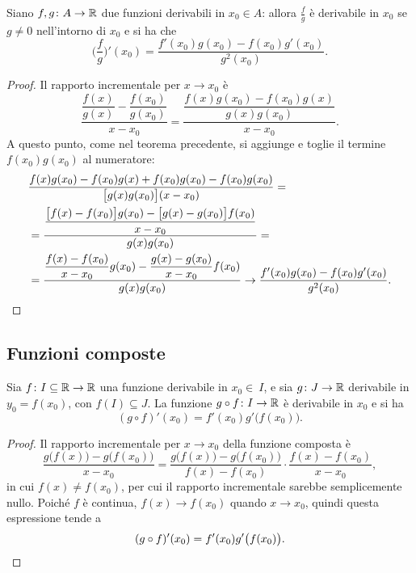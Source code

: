 \begin{proprieta}
Siano $f,g\colon A\to\mathbb{R}$ due funzioni derivabili in $x_0\in A$: allora $\frac{f}{g}$ è derivabile in $x_0$ se $g\neq 0$ nell'intorno di $x_0$ e si ha che
\begin{equation}
\bigg(\frac{f}{g}\bigg)'(x_0)=\frac{f'(x_0)g(x_0)-f(x_0)g'(x_0)}{g^2(x_0)}.
\end{equation}
\end{proprieta}
\begin{proof}
Il rapporto incrementale per $x\to x_0$ è
\[
\frac{\dfrac{f(x)}{g(x)}-\dfrac{f(x_0)}{g(x_0)}}{x-x_0}=\frac{\dfrac{f(x)g(x_0)-f(x_0)g(x)}{g(x)g(x_0)}}{x-x_0}.
\]
A questo punto, come nel teorema precedente, si aggiunge e toglie il termine $f(x_0)g(x_0)$ al numeratore:
\begin{align*}
&\frac{f(x)g(x_0)-f(x_0)g(x)+f(x_0)g(x_0)-f(x_0)g(x_0)}{\big[g(x)g(x_0)\big](x-x_0)}=\\
&=\frac{\dfrac{\big[f(x)-f(x_0)\big]g(x_0)-\big[g(x)-g(x_0)\big]f(x_0)}{x-x_0}}{g(x)g(x_0)}=\\
&=\frac{\dfrac{f(x)-f(x_0)}{x-x_0}g(x_0)-\dfrac{g(x)-g(x_0)}{x-x_0}f(x_0)}{g(x)g(x_0)}\to\frac{f'(x_0)g(x_0)-f(x_0)g'(x_0)}{g^2(x_0)}.\qedhere
\end{align*}
\end{proof}
\subsection{Funzioni composte}
\begin{proprieta}
Sia $f\colon I\subseteq\mathbb{R}\to\mathbb{R}$ una funzione derivabile in $x_0\in\ I$, e sia $g\colon J\to\mathbb{R}$ derivabile in $y_0=f(x_0)$, con $f(I)\subseteq J$. La funzione $g\circ f\colon I\to\mathbb{R}$ è derivabile in $x_0$ e si ha
\begin{equation}
(g\circ f)'(x_0)=f'(x_0)g'\big(f(x_0)\big).
\end{equation}
\end{proprieta}
\begin{proof}
Il rapporto incrementale per $x\to x_0$ della funzione composta è
\[
\frac{g\big(f(x)\big)-g\big(f(x_0)\big)}{x-x_0}=\frac{g\big(f(x)\big)-g\big(f(x_0)\big)}{f(x)-f(x_0)}\cdot\frac{f(x)-f(x_0)}{x-x_0},
\]
in cui $f(x)\neq f(x_0)$, per cui il rapporto incrementale sarebbe semplicemente nullo. Poiché $f$ è continua, $f(x)\to f(x_0)$ quando $x\to x_0$, quindi questa espressione tende a
\[
(g\circ f)'(x_0)=f'(x_0)g'\big(f(x_0)\big).\qedhere
\]
\end{proof}
